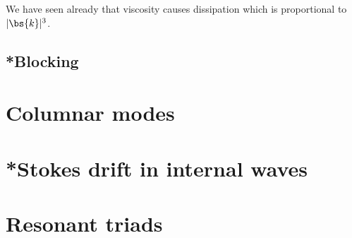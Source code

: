 We have seen already that viscosity causes dissipation which is proportional to
$|\bs{k}|^3$. 

\subsection{*Blocking}

\section{Columnar modes}
\section{*Stokes drift in internal waves}
\section{Resonant triads}

